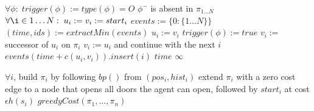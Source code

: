 \documentclass[letterpaper]{article}
\begin{document}
\begin{algorithm}
\caption{$greedyCost(\pi_1,\ldots,\pi_n)$}
\label{alg:update}
\begin{algorithmic}
\STATE $\forall\phi:\; trigger(\phi) := type(\phi) = O$ \OR $\phi^-$ is absent in $\pi_{1\ldots N}$
\STATE $\forall \i\in 1\ldots N:\; u_i := v_i := start_i$
\STATE $events := \{0: \{1\ldots N\}\}$
\STATE $(time, ids) := extractMin(events)$
\STATE $u_i := v_i$
\STATE $trigger(\phi) := true$
\ENDIF
\ENDFOR
\ENDFOR
{}
\STATE $v_i :=$ successor of $u_i$ on $\pi_i$
\STATE $v_i := u_i$ and continue with the next $i$
\ENDIF
\ENDFOR
\STATE $events(time+c(u_i,v_i)).insert(i)$
\ENDFOR
\ENDWHILE
{}
\RETURN $time$
\ELSE
\RETURN $\infty$
\ENDIF
\end{algorithmic}
\end{algorithm}

\begin{algorithm}
\caption{$jointPriority((pos_1,hist_1),\ldots,(pos_N,hist_N))$}
\label{alg:update}
\begin{algorithmic}
\STATE $\forall i$, build $\pi_i$ by following $bp()$ from $(pos_i, hist_i)$
\STATE extend $\pi_i$ with a zero cost edge to a node that opens all doors the agent can open, followed by $start_i$ at cost $\epsilon h(s_i)$
\ENDFOR
\RETURN $greedyCost(\pi_1,\ldots,\pi_n)$
\end{algorithmic}
\end{algorithm}



\end{document}
